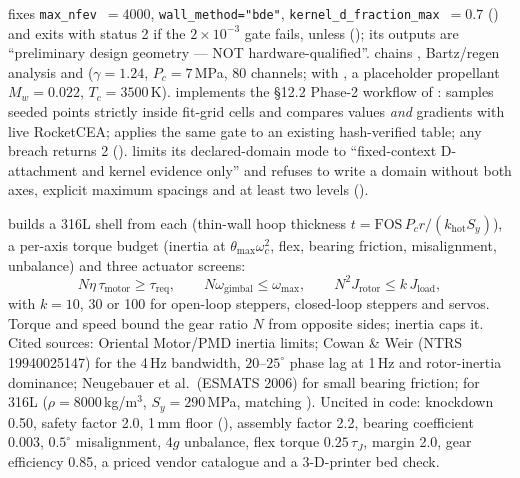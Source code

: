  fixes \texttt{max\_nfev}~$=4000$, \texttt{wall\_method="bde"}, \texttt{kernel\_d\_fraction\_max}~$=0.7$ () and exits with status 2 if the $2\times10^{-3}$ gate fails, unless  (); its outputs are ``preliminary design geometry --- NOT hardware-qualified''.  chains , Bartz/regen analysis and  ($\gamma=1.24$, $P_c=7$\,MPa, 80 channels; with , a placeholder propellant $M_w=0.022$, $T_c=3500$\,K).  implements the \S12.2 Phase-2 workflow of :  samples seeded points strictly inside fit-grid cells and compares values \emph{and} gradients with live RocketCEA;  applies the same gate to an existing hash-verified table; any breach returns 2 ().  limits its declared-domain mode to ``fixed-context D-attachment and kernel evidence only'' and refuses to write a domain without both axes, explicit maximum spacings and at least two  levels ().

 builds a 316L shell from each  (thin-wall hoop thickness $t=\text{FOS}\,P_c r/(k_{\text{hot}}S_y)$), a per-axis torque budget (inertia at $\theta_{\max}\omega_c^2$, flex, bearing friction, misalignment, unbalance) and three actuator screens:
\[
N\eta\,\tau_{\text{motor}} \ge \tau_{\text{req}},\qquad
N\omega_{\text{gimbal}} \le \omega_{\max},\qquad
N^2 J_{\text{rotor}} \le k\,J_{\text{load}},
\]
with $k=10$, 30 or 100 for open-loop steppers, closed-loop steppers and servos. Torque and speed bound the gear ratio $N$ from opposite sides; inertia caps it. Cited sources: Oriental Motor/PMD inertia limits; Cowan \& Weir (NTRS 19940025147) for the 4\,Hz bandwidth, $20$--$25^\circ$ phase lag at 1\,Hz and rotor-inertia dominance; Neugebauer et al.\ (ESMATS 2006) for small bearing friction;  for 316L ($\rho=8000$\,kg/m$^3$, $S_y=290$\,MPa, matching ). Uncited in code: knockdown 0.50, safety factor 2.0, 1\,mm floor (), assembly factor 2.2, bearing coefficient 0.003, $0.5^\circ$ misalignment, $4g$ unbalance, flex torque $0.25\,\tau_J$, margin 2.0, gear efficiency 0.85, a priced vendor catalogue and a 3-D-printer bed check.

